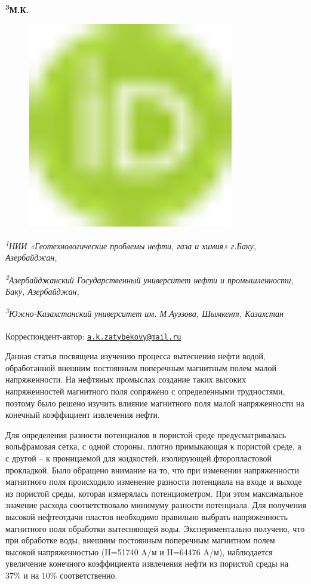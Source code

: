 {{\bfseries \textsuperscript{3}М.К.
\begin{figure}[H]
	\centering
	\includegraphics[width=0.8\textwidth]{media/gorn4/image1}
	\caption*{}
\end{figure}


\emph{\textsuperscript{1}НИИ «Геотехнологические проблемы нефти, газа и
химия» г.Баку, Азербайджан,}

\emph{\textsuperscript{2}Азербайджанский Государственный университет
нефти и промышленности, Баку, Азербайджан,}

\emph{\textsuperscript{3}Южно-Казахстанский университет им. М.Ауэзова,
Шымкент, Казахстан}

{\bfseries \textsuperscript{\envelope }}Корреспондент-автор:
\href{mailto:a.k.zatybekovy@mail.ru}{\nolinkurl{a.k.zatybekovy@mail.ru}}

Данная статья посвящена изучению процесса вытеснения нефти водой,
обработанной внешним постоянным поперечным магнитным полем малой
напряженности. На нефтяных промыслах создание таких высоких
напряженностей магнитного поля сопряжено с определенными трудностями,
поэтому было решено изучить влияние магнитного поля малой напряженности
на конечный коэффициент извлечения нефти.

Для определения разности потенциалов в пористой среде предусматривалась
вольфрамовая сетка, с одной стороны, плотно примыкающая к пористой
среде, а с другой -- к проницаемой для жидкостей, изолирующей
фторопластовой прокладкой. Было обращено внимание на то, что при
изменении напряженности магнитного поля происходило изменение разности
потенциала на входе и выходе из пористой среды, которая измерялась
потенциометром. При этом максимальное значение расхода соответствовало
минимуму разности потенциала. Для получения высокой нефтеотдачи пластов
необходимо правильно выбрать напряженность магнитного поля обработки
вытесняющей воды. Экспериментально получено, что при обработке воды,
внешним постоянным поперечным магнитном полем высокой напряженностью
(H=51740 A/м и H=64476 A/м), наблюдается увеличение конечного
коэффициента извлечения нефти из пористой среды на 37\% и на 10\%
соответственно.

}}
